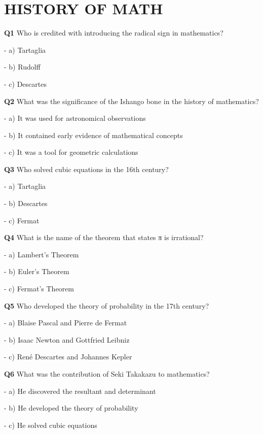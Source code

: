 \section{HISTORY OF MATH}

\textbf{Q1} Who is credited with introducing the radical sign in mathematics?\par
\quad - a) Tartaglia\par
\quad - b) Rudolff\par
\quad - c) Descartes\par

\textbf{Q2} What was the significance of the Ishango bone in the history of mathematics?\par
\quad - a) It was used for astronomical observations\par
\quad - b) It contained early evidence of mathematical concepts\par
\quad - c) It was a tool for geometric calculations\par

\textbf{Q3} Who solved cubic equations in the 16th century?\par
\quad - a) Tartaglia\par
\quad - b) Descartes\par
\quad - c) Fermat\par

\textbf{Q4} What is the name of the theorem that states π is irrational?\par
\quad - a) Lambert's Theorem\par
\quad - b) Euler's Theorem\par
\quad - c) Fermat's Theorem\par

\textbf{Q5} Who developed the theory of probability in the 17th century?\par
\quad - a) Blaise Pascal and Pierre de Fermat\par
\quad - b) Isaac Newton and Gottfried Leibniz\par
\quad - c) René Descartes and Johannes Kepler\par

\textbf{Q6} What was the contribution of Seki Takakazu to mathematics?\par
\quad - a) He discovered the resultant and determinant\par
\quad - b) He developed the theory of probability\par
\quad - c) He solved cubic equations\par

